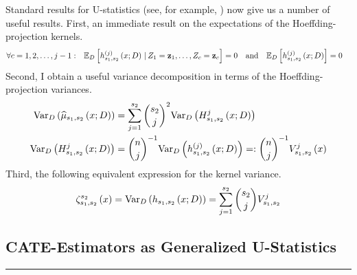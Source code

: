 Standard results for U-statistics (see, for example, \citet{lee_u-statistics_2019}) now give us a number of useful results.
First, an immediate result on the expectations of the Hoeffding-projection kernels.
\begin{align}\label{eq:H_k_expectation}
	\forall c = 1,2,\dotsc, j-1: \quad & \mathbb{E}_{D}\left[h_{s_1, s_2}^{(j)}\left(x; D\right) \, | \, Z_1 = \mathbf{z}_1, \dotsc, Z_c = \mathbf{z}_c\right] = 0
	\quad \text{and} \quad
	\mathbb{E}_{D}\left[h_{s_1, s_2}^{(j)}\left(x; D\right)\right] = 0
\end{align}
Second, I obtain a useful variance decomposition in terms of the Hoeffding-projection variances.
\begin{align}\label{eq:Var_decomp}
	\text{Var}_{D}\left(\widehat{\mu}_{s_1, s_2}\left(x; D\right)\right)
	 & = \sum_{j = 1}^{s_2} \binom{s_2}{j}^2 \text{Var}_{D}\left(H_{s_1, s_2}^{j}\left(x; D\right)\right) \\
	\text{Var}_{D}\left(H_{s_1, s_2}^{j}\left(x; D\right)\right)
	 & = \binom{n}{j}^{-1} \text{Var}_{D}\left(h_{s_1, s_2}^{(j)}\left(x; D\right)\right)
	=: \binom{n}{j}^{-1} V_{s_1, s_2}^{j}\left(x\right)
\end{align}
Third, the following equivalent expression for the kernel variance.
\begin{equation}\label{eq:k_var}
	\zeta_{s_1, s_2}^{s_2}\left(x\right)
	= \text{Var}_{D}\left(h_{s_1, s_2}\left(x; D\right)\right)
	= \sum_{j = 1}^{s_2} \binom{s_2}{j}V_{s_1, s_2}^{j}
\end{equation}

\subsection{CATE-Estimators as Generalized U-Statistics}
\hrule

